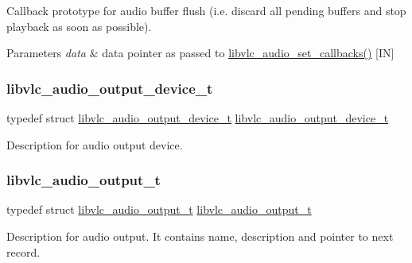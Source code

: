 Callback prototype for audio buffer flush (i.\+e. discard all pending buffers and stop playback as soon as possible). 
\begin{DoxyParams}{Parameters}
{\em data} & data pointer as passed to \hyperlink{group__libvlc__media__player_gaac7abb1d8be3f60bb9da20c000703790}{libvlc\+\_\+audio\+\_\+set\+\_\+callbacks()} \mbox{[}IN\mbox{]} \\
\hline
\end{DoxyParams}
\mbox{\label{group__libvlc__media__player_ga88bc71eb38580ffea67174c817b51c8f}} 
\subsubsection{\texorpdfstring{libvlc\+\_\+audio\+\_\+output\+\_\+device\+\_\+t}{libvlc\_audio\_output\_device\_t}}
{\footnotesize\ttfamily typedef struct \hyperlink{structlibvlc__audio__output__device__t}{libvlc\+\_\+audio\+\_\+output\+\_\+device\+\_\+t}  \hyperlink{structlibvlc__audio__output__device__t}{libvlc\+\_\+audio\+\_\+output\+\_\+device\+\_\+t}}

Description for audio output device. \mbox{\label{group__libvlc__media__player_gad740a59b9fe0043e1836f864a71cda01}} 
\subsubsection{\texorpdfstring{libvlc\+\_\+audio\+\_\+output\+\_\+t}{libvlc\_audio\_output\_t}}
{\footnotesize\ttfamily typedef struct \hyperlink{structlibvlc__audio__output__t}{libvlc\+\_\+audio\+\_\+output\+\_\+t}  \hyperlink{structlibvlc__audio__output__t}{libvlc\+\_\+audio\+\_\+output\+\_\+t}}

Description for audio output. It contains name, description and pointer to next record. \mbox{\label{group__libvlc__media__player_gaac6c92b1a3d331c73fbbba11140fca4e}} 
